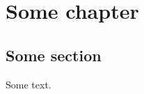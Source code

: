 \documentclass{report}
\begin{document}
\tableofcontents
\chapter{Some chapter}
\section{Some section}
Some text.
\end{document}
